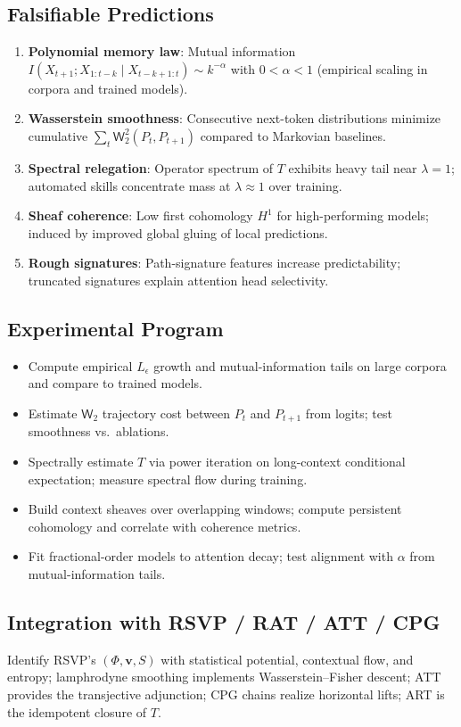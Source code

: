 \documentclass[12pt,a4paper,twoside,openright]{book}
\begin{document}
\subsection{Falsifiable Predictions}
\begin{enumerate}[leftmargin=1.2em]
\item \textbf{Polynomial memory law}: Mutual information $I(X_{t+1};X_{1:t-k}\mid X_{t-k+1:t})\sim k^{-\alpha}$ with $0<\alpha<1$ (empirical scaling in corpora and trained models).
\item \textbf{Wasserstein smoothness}: Consecutive next-token distributions minimize cumulative $\sum_t \mathsf{W}_2^2(P_t,P_{t+1})$ compared to Markovian baselines.
\item \textbf{Spectral relegation}: Operator spectrum of $T$ exhibits heavy tail near $\lambda=1$; automated skills concentrate mass at $\lambda\approx 1$ over training.
\item \textbf{Sheaf coherence}: Low first cohomology $H^1$ for high-performing models; induced by improved global gluing of local predictions.
\item \textbf{Rough signatures}: Path-signature features increase predictability; truncated signatures explain attention head selectivity.
\end{enumerate}

\subsection{Experimental Program}
\begin{itemize}[leftmargin=1.2em]
\item Compute empirical $L_\epsilon$ growth and mutual-information tails on large corpora and compare to trained models.
\item Estimate $\mathsf{W}_2$ trajectory cost between $P_t$ and $P_{t+1}$ from logits; test smoothness vs.\ ablations.
\item Spectrally estimate $T$ via power iteration on long-context conditional expectation; measure spectral flow during training.
\item Build context sheaves over overlapping windows; compute persistent cohomology and correlate with coherence metrics.
\item Fit fractional-order models to attention decay; test alignment with $\alpha$ from mutual-information tails.
\end{itemize}

\subsection{Integration with RSVP / RAT / ATT / CPG}
Identify RSVP’s $(\Phi,\mathbf{v},S)$ with statistical potential, contextual flow, and entropy; lamphrodyne smoothing implements Wasserstein–Fisher descent; ATT provides the transjective adjunction; CPG chains realize horizontal lifts; ART is the idempotent closure of $T$.
\end{document}
